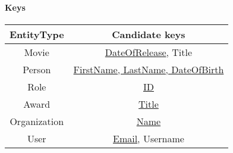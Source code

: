\paragraph{Keys}

\begin{tabular}{| c | c |}
\hline
EntityType & Candidate keys\\
\hline 
\hline
Movie & \underline{DateOfRelease}, Title\\
\hline
Person & \underline{FirstName, LastName, DateOfBirth}\\
\hline
Role & \underline{ID}\\
\hline
\hline 
Award & \underline{Title}\\
\hline
Organization & \underline{Name}\\
\hline
User & \underline{Email}, Username\\
\hline
\end{tabular}

